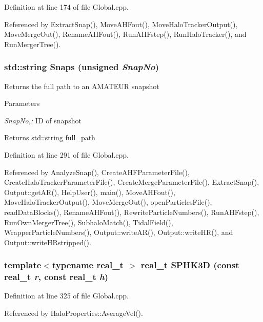Definition at line 174 of file Global.cpp.



Referenced by ExtractSnap(), MoveAHFout(), MoveHaloTrackerOutput(), MoveMergeOut(), RenameAHFout(), RunAHFstep(), RunHaloTracker(), and RunMergerTree().

\subsubsection[{Snaps}]{\setlength{\rightskip}{0pt plus 5cm}std::string Snaps (unsigned {\em SnapNo})}\label{Global_8cpp_ab95a6a07eed667f94b0951a15f1a9b0e}
Returns the full path to an AMATEUR snapshot 
\begin{DoxyParams}{Parameters}
\item[{\em SnapNo,:}]ID of snapshot \end{DoxyParams}
\begin{DoxyReturn}{Returns}
std::string full\_\-path 
\end{DoxyReturn}


Definition at line 291 of file Global.cpp.



Referenced by AnalyzeSnap(), CreateAHFParameterFile(), CreateHaloTrackerParameterFile(), CreateMergeParameterFile(), ExtractSnap(), Output::getAR(), HelpUser(), main(), MoveAHFout(), MoveHaloTrackerOutput(), MoveMergeOut(), openParticlesFile(), readDataBlocks(), RenameAHFout(), RewriteParticleNumbers(), RunAHFstep(), RunOwnMergerTree(), SubhaloMatch(), TidalField(), WrapperParticleNumbers(), Output::writeAR(), Output::writeHR(), and Output::writeHRstripped().

\subsubsection[{SPHK3D}]{\setlength{\rightskip}{0pt plus 5cm}template$<$typename real\_\-t $>$ real\_\-t SPHK3D (const real\_\-t {\em r}, \/  const real\_\-t {\em h})}\label{Global_8cpp_a0cb8e9ba7bd0b1861c15a42aa799dcd4}


Definition at line 325 of file Global.cpp.



Referenced by HaloProperties::AverageVel().

